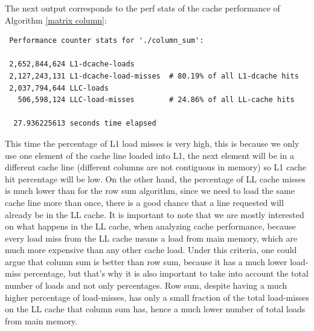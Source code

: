 \documentclass[12pt]{diicc}
\begin{document}
The next output corresponds to the perf stats of the cache performance of Algorithm \ref{matrix column}:

\begin{verbatim}
 Performance counter stats for './column_sum':                                                                                                              
                                                                                                                                                              
 2,652,844,624 L1-dcache-loads                                                                                                        
 2,127,243,131 L1-dcache-load-misses  # 80.19% of all L1-dcache hits                                                                 
 2,037,794,644 LLC-loads                                                                                                              
   506,598,124 LLC-load-misses        # 24.86% of all LL-cache hits                                                                  
                                                                                                                                                              
  27.936225613 seconds time elapsed
\end{verbatim} 

This time the percentage of L1 load misses is very high, this is because we only use one element of the cache line loaded into L1, the next element will be in a different cache line (different columns are not contiguous in memory) so L1 cache hit percentage will be low. On the other hand, the percentage of LL cache misses is much lower than for the row sum algorithm, since we need to load the same cache line more than once, there is a good chance that a line requested will already be in the LL cache. It is important to note that we are mostly interested on what happens in the LL cache, when analyzing cache performance, because every load miss from the LL cache means a load from main memory, which are much more expensive than any other cache load. Under this criteria, one could argue that column sum is better than row sum, because it has a much lower load-miss percentage, but that's why it is also important to take into account the total number of loads and not only percentages. Row sum, despite having a much higher percentage of load-misses, has only a small fraction of the total load-misses on the LL cache that column sum has, hence a much lower number of total loads from main memory.
\end{document}
